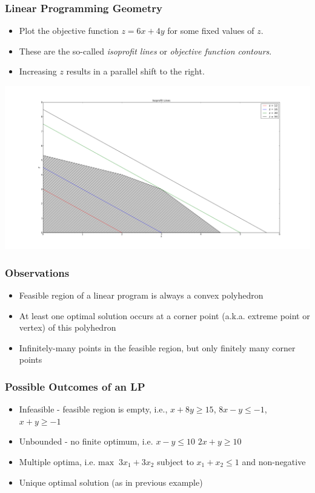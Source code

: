 \documentclass[12pt,handout]{beamer}
\begin{document}
\begin{frame}
\frametitle{Linear Programming Geometry}
\scriptsize
\begin{itemize}
\item Plot the objective function $z = 6x + 4y$ for some fixed values of $z$.
\item These are the so-called {\em isoprofit lines} or {\em objective function contours}.
\item Increasing $z$ results in a parallel shift to the right.
\end{itemize}
\includegraphics[scale=0.2]{isoprofit_lines.png}
\end{frame}

\begin{frame}
\frametitle{Observations}
\begin{itemize}
\item Feasible region of a linear program is always a convex polyhedron
\item At least one optimal solution occurs at a corner point (a.k.a. extreme point or vertex) of this polyhedron
\item Infinitely-many points in the feasible region, but only finitely many corner points
\end{itemize}
\end{frame}

\begin{frame}
\frametitle{Possible Outcomes of an LP}
\begin{itemize}
\item Infeasible - feasible region is empty, i.e., 
$x + 8y \ge 15$, $8x - y \le -1$, $x + y \ge -1$
\item Unbounded - no finite optimum, i.e. $x - y \le 10$ $2x + y \ge 10$
\item Multiple optima, i.e. $\mbox{max}\;\; 3x_1 + 3x_2$ subject to $x_1 + x_2 \le 1$ and non-negative
\item Unique optimal solution (as in previous example)
\end{itemize}
\end{frame}
\end{document}
